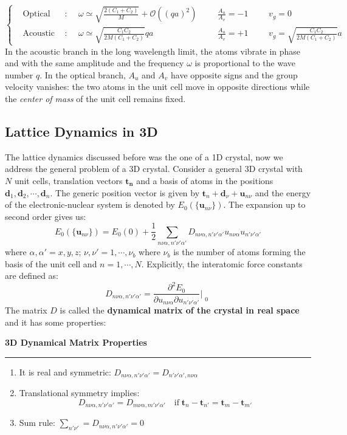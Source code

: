 \documentclass[10.75pt,a4paper,openright,bottom=2cm]{article}
\renewcommand{\Vec}[1]{\boldsymbol{#1}}
\begin{document}
\[
\left\{
\begin{aligned}
&\text{Optical branch}: &&\omega\simeq\sqrt{\frac{2(C_1+C_2)}{M}}+\mathcal{O}((qa)^2) &&&\frac{A_u}{A_v}=-1 &&&v_g=0\\
&\text{Acoustic branch}: &&\omega\simeq\sqrt{\frac{C_1C_2}{2M(C_1+C_2)}}qa &&&\frac{A_u}{A_v}=+1 &&&v_g=\sqrt{\frac{C_1C_2}{2M(C_1+C_2)}}a
\end{aligned}
\right.
\]
In the acoustic branch in the long wavelength limit, the atoms vibrate in phase and with the same amplitude and the frequency $\omega$ is proportional to the wave number $q$. In the optical branch, $A_u$ and $A_v$ have opposite signs and the group velocity vanishes: the two atoms in the unit cell move in opposite directions while the \textit{center of mass} of the unit cell remains fixed.
\subsection{Lattice Dynamics in 3D}
The lattice dynamics discussed before was the one of a 1D crystal, now we address the general problem of a 3D crystal. Consider a general 3D crystal with $N$ unit cells, translation vectors $\Vec{t_n}$ and a basis of atoms in the positions $\Vec{d}_1,\Vec{d}_2,\cdots,\Vec{d}_n$. The generic position vector is given by $\Vec{t}_n+\Vec{d}_\nu+\Vec{u}_{n\nu}$ and the energy of the electronic-nuclear system is denoted by $E_0(\{\Vec{u}_{n\nu}\})$. The expansion up to second order gives us:
\[
E_0(\{\Vec{u}_{n\nu}\})=E_0(0)+\frac{1}{2}\sum_{n\nu\alpha,n'\nu'\alpha'}D_{n\nu\alpha,n'\nu'\alpha'}u_{n\nu\alpha}u_{n'\nu'\alpha'}
\]
where $\alpha,\alpha'=x,y,z$; $\nu,\nu'=1,\cdots,\nu_b$ where $\nu_b$ is the number of atoms forming the basis of the unit cell and $n=1,\cdots,N$. Explicitly, the interatomic force constants are defined as:
\[
D_{n\nu\alpha,n'\nu'\alpha'}=\frac{\partial^2E_0}{\partial u_{n\nu\alpha}\partial u_{n'\nu'\alpha'}}\Bigr|_{\substack{0}}
\]
The matrix $D$ is called the \textbf{dynamical matrix of the crystal in real space} and it has some properties:
\begin{mybox}
\textbf{3D Dynamical Matrix Properties}
\hrule
\begin{enumerate}\renewcommand{\labelenumi}{\arabic{enumi})}
    \item It is real and symmetric: $D_{n\nu\alpha,n'\nu'\alpha'}=D_{n'\nu'\alpha',n\nu\alpha}$
    \item Translational symmetry implies: 
    \[
    D_{n\nu\alpha,n'\nu'\alpha'}=D_{m\nu\alpha,m'\nu'\alpha'} \quad\text{if}\; \Vec{t}_n-\Vec{t}_{n'}=\Vec{t}_m-\Vec{t}_{m'}
    \]
    \item Sum rule: $\sum_{n'\nu'}=D_{n\nu\alpha,n'\nu'\alpha'}=0$
\end{enumerate}
\end{mybox}
\end{document}
